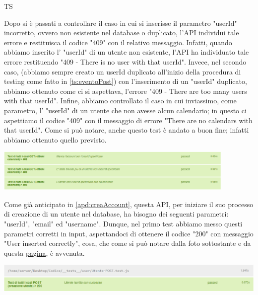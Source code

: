 \begin{listaPersonale}{TS}
\begin{center}
                \end{center}
                Dopo si è passati a controllare il caso in cui si inserisse il parametro "userId" incorretto, ovvero non esistente nel database o duplicato, l'API individui tale errore e restituisca il codice "409" con il relativo messaggio. Infatti, quando abbiamo inserito l' "userId" di un utente non esistente, l'API ha individuato tale errore restituendo "409 - There is no user with that userId". Invece, nel secondo caso, (abbiamo sempre creato un userId duplicato all'inizio della procedura di testing come fatto in \ref{ts:eventoPost}) con l'inserimento di un "userId" duplicato, abbiamo ottenuto come ci si aspettava, l'errore "409 - There are too many users with that userId".
                Infine, abbiamo controllato il caso in cui inviassimo, come parametro, l' "userId" di un utente che non avesse alcun calendario; in questo ci aspettiamo il codice "409" con il messaggio di errore "There are no calendars with that userId". Come si può notare, anche questo test è andato a buon fine; infatti abbiamo ottenuto  quello previsto.
                \begin{center}
                        \includegraphics[width=0.87\textwidth, height=0.09\textheight]{img/png/tests/CalendarioGet/409_getCalendari.png}
                \end{center}
                Come già anticipato in \ref{apd:creaAccount}, questa API, per iniziare il suo processo di creazione di un utente nel database, ha bisogno dei seguenti parametri: "userId", "email" ed "username". Dunque, nel primo test abbiamo messo questi parametri corretti in input, aspettandoci di ottenere il codice "200" con messaggio "User inserted correctly", cosa, che come si può notare dalla foto sottostante e da questa \href{https://plan-it.it/test-report.html} {pagina}, è avvenuta.
                \begin{center}
                        \includegraphics[width=1\textwidth, height=0.08\textheight]{img/png/tests/UtentePost/200_postUtente.png}

\end{center}
\end{listaPersonale}
